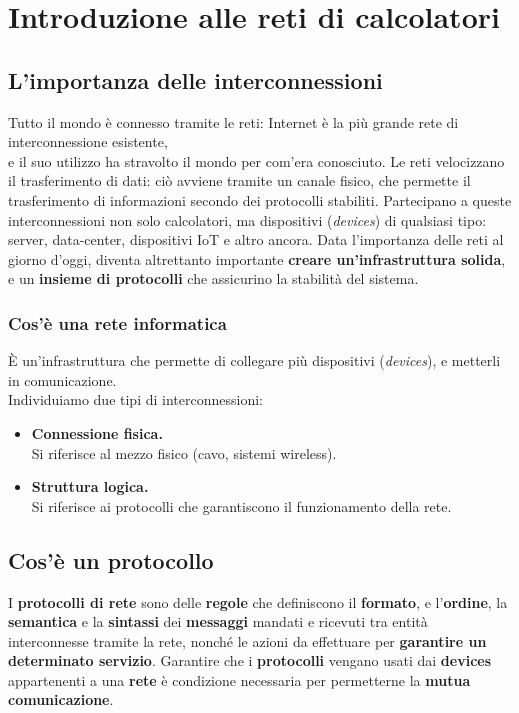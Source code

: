 \chapter{Introduzione alle reti di calcolatori}

\section{L'importanza delle interconnessioni}
Tutto il mondo è connesso tramite le reti: Internet è la più grande rete di interconnessione esistente,\\ e il suo utilizzo ha stravolto il mondo per com'era conosciuto. 
Le reti velocizzano il trasferimento di dati: ciò avviene tramite un canale fisico, che permette il trasferimento di informazioni secondo dei protocolli stabiliti. Partecipano a queste interconnessioni non solo calcolatori, ma dispositivi (\textit{devices}) di qualsiasi tipo: server, data-center, dispositivi IoT e altro ancora. Data l'importanza delle reti al giorno d'oggi, diventa altrettanto importante \textbf{creare un'infrastruttura solida}, e un \textbf{insieme di protocolli} che assicurino la stabilità del sistema.

\subsection{Cos'è una rete informatica}
È un'infrastruttura che permette di collegare più dispositivi (\textit{devices}), e metterli in comunicazione.\\
Individuiamo due tipi di interconnessioni:
\begin{itemize}
    \item \textbf{Connessione fisica.}\\
    Si riferisce al mezzo fisico (cavo, sistemi wireless).
    \item \textbf{Struttura logica.}\\
    Si riferisce ai protocolli che garantiscono il funzionamento della rete.
\end{itemize}

\newpage

\section{Cos'è un protocollo}\label{1.2.1}
I \textbf{protocolli di rete} sono delle \textbf{regole} che definiscono il \textbf{formato}, e l'\textbf{ordine}, la \textbf{semantica} e la \textbf{sintassi} dei \textbf{messaggi} mandati e ricevuti tra entità interconnesse tramite la rete, nonché le azioni da effettuare per \textbf{garantire un determinato servizio}. Garantire che i \textbf{protocolli} vengano usati dai \textbf{devices} appartenenti a una \textbf{rete} è condizione necessaria per permetterne la \textbf{mutua comunicazione}.

